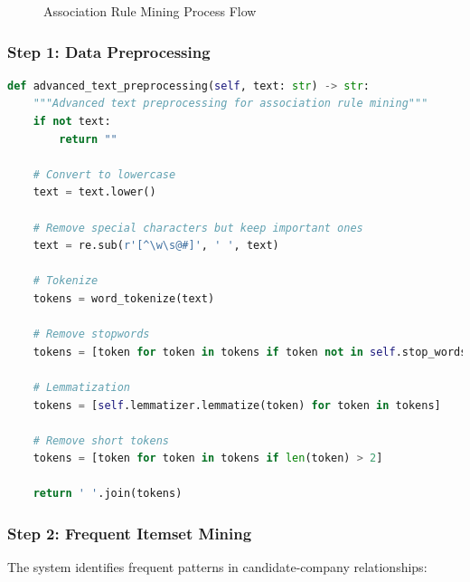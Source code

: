 \documentclass[12pt,a4paper]{article}
\begin{document}
\begin{figure}[H]
\caption{Association Rule Mining Process Flow}
\end{figure}

\subsubsection{Step 1: Data Preprocessing}
\begin{lstlisting}[language=Python, caption=Data Preprocessing for Association Rules]
def advanced_text_preprocessing(self, text: str) -> str:
    """Advanced text preprocessing for association rule mining"""
    if not text:
        return ""
    
    # Convert to lowercase
    text = text.lower()
    
    # Remove special characters but keep important ones
    text = re.sub(r'[^\w\s@#]', ' ', text)
    
    # Tokenize
    tokens = word_tokenize(text)
    
    # Remove stopwords
    tokens = [token for token in tokens if token not in self.stop_words]
    
    # Lemmatization
    tokens = [self.lemmatizer.lemmatize(token) for token in tokens]
    
    # Remove short tokens
    tokens = [token for token in tokens if len(token) > 2]
    
    return ' '.join(tokens)
\end{lstlisting}

\subsubsection{Step 2: Frequent Itemset Mining}
The system identifies frequent patterns in candidate-company relationships:
\end{document}
